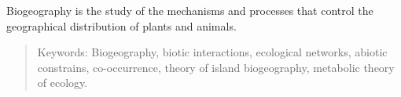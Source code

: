 Biogeography is the study of the mechanisms and processes that control
the geographical distribution of plants and animals.

\begin{quote}
Keywords: Biogeography, biotic interactions, ecological networks,
abiotic constrains, co-occurrence, theory of island biogeography,
metabolic theory of ecology.
\end{quote}
